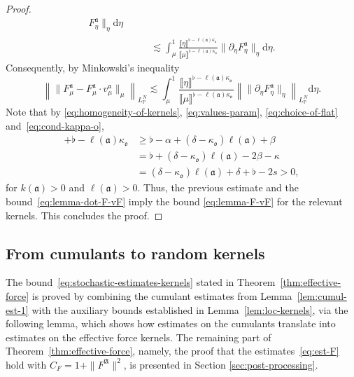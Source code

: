 \documentclass{article}
\numberwithin{equation}{section}
\newcommand{\mathd}{\mathrm{d}}
\theoremstyle{plain}
\theoremstyle{definition}
\begin{document}
\begin{proof}
\begin{align*}
     F^{\mathfrak{a}}_{\eta} \|_{\eta} \mathd \eta\\
     &\qquad \lesssim \int_{\mu}^1
     \frac{\llbracket \eta \rrbracket^{\flat - \ell
     (\mathfrak{a}) \kappa_{\mathfrak{o}}}}{\llbracket \mu \rrbracket^{\flat -
     \ell (\mathfrak{a}) \kappa_{\mathfrak{o}}}}  \| \partial_{\eta}
     F^{\mathfrak{a}}_{\eta} \|_{\eta} \mathd \eta .
  \end{align*}
  Consequently, by Minkowski's inequality
  \[ \left\| \| F^{\mathfrak{a}}_{\mu} - F^{\mathfrak{a}}_{\mu} \cdot
     v^{\mathfrak{a}}_{\mu} \|_{\mu} \right\|_{L_{\mathbb{P}}^N} \lesssim
     \int_{\mu}^1 \frac{\llbracket \eta \rrbracket^{\flat -
     \ell (\mathfrak{a}) \kappa_{\mathfrak{o}}}}{\llbracket \mu
     \rrbracket^{\flat - \ell (\mathfrak{a}) \kappa_{\mathfrak{o}}}}
     \left\| \| \partial_{\eta} F^{\mathfrak{a}}_{\eta} \|_{\eta}
     \right\|_{L_{\mathbb{P}}^N}
     \mathd \eta . \]
  Note that by \eqref{eq:homogeneity-of-kernels}, \eqref{eq:values-param},
  \eqref{eq:choice-of-flat} and~\eqref{eq:cond-kappa-o},
  \begin{align*}
    [\mathfrak{a}] + \flat - \ell(\mathfrak{a})\kappa_{\mathfrak{o}}
    &\geqslant \flat - \alpha
    + (\delta - \kappa_{\mathfrak{o}})\ell(\mathfrak{a}) + \beta\\
    &= \flat + (\delta - \kappa_{\mathfrak{o}})\ell(\mathfrak{a})
    - 2 \beta - \kappa\\
    &= (\delta - \kappa_{\mathfrak{o}})\ell(\mathfrak{a})
    + \delta + \flat - 2 s > 0,
  \end{align*}
  for $k (\mathfrak{a}) > 0$ and $\ell (\mathfrak{a}) > 0$. Thus, the previous
  estimate and the bound~\eqref{eq:lemma-dot-F-vF} imply the bound
  \eqref{eq:lemma-F-vF} for the relevant kernels. This concludes the proof.
\end{proof}

\subsection{From cumulants to random
kernels}\label{sec:concl-of-cumul-analysis}

The bound~\eqref{eq:stochastic-estimates-kernels} stated in
Theorem~\ref{thm:effective-force} is proved by combining the cumulant
estimates from Lemma~\ref{lem:cumul-est-1} with the auxiliary bounds
established in Lemma~\ref{lem:loc-kernels}, via the following lemma, which
shows how estimates on the cumulants translate into estimates on the effective
force kernels. The remaining part of Theorem~\ref{thm:effective-force},
namely, the proof that the estimates~\eqref{eq:est-F} hold with $C_F = 1 + \|
F^{\mathfrak{A}} \|^2$, is presented in Section \ref{sec:post-processing}.
\end{document}
